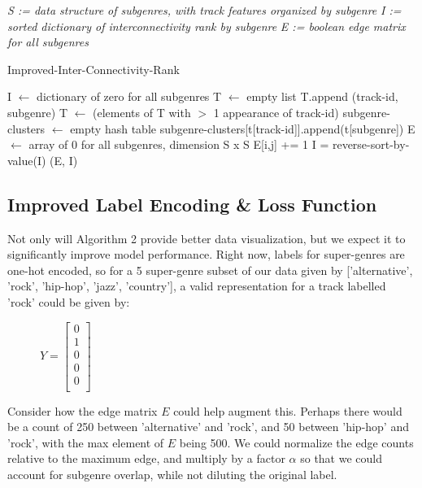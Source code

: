 \documentclass[conference]{IEEEtran}
\begin{document}
\begin{algorithm} 
\textit{S := data structure of subgenres, with track features organized by subgenre}
\newline
\textit{I := sorted dictionary of interconnectivity rank by subgenre}
\newline
\textit{E := boolean edge matrix for all subgenres}
\newline
{}
\newline
\begin{algorithmic}[H]
\caption{Improved-Inter-Connectivity-Rank}
\STATE I $\gets$ dictionary of zero for all subgenres
\STATE T $\gets$ empty list
\STATE T.append (track-id, subgenre) 
\ENDFOR
\ENDFOR
\STATE T $\gets$ (elements of T with $>$ 1 appearance of track-id)
\STATE subgenre-clusters $\gets$ empty hash table
\STATE subgenre-clusters[t[track-id]].append(t[subgenre])
\ENDFOR
\STATE E $\gets$ array of $0$ for all subgenres, dimension S x S
\STATE E[i,j] += 1
\ENDFOR
\ENDFOR
{}
\ENDIF
\ENDFOR
\ENDFOR
\STATE I = reverse-sort-by-value(I)
\RETURN (E, I)
\end{algorithmic}
\end{algorithm}
\raggedbottom
\subsection{Improved Label Encoding \& Loss Function}
Not only will Algorithm 2 provide better data visualization, but we expect it to significantly improve model performance. Right now, labels for super-genres are one-hot encoded, so for a 5 super-genre subset of our data given by ['alternative', 'rock', 'hip-hop', 'jazz', 'country'], a valid representation for a track labelled 'rock' could be given by:

\begin{figure}[ht]
\centering
$Y=
\begin{bmatrix}
0\\
1\\
0\\
0\\
0\\
\end{bmatrix}
$
\end{figure}

Consider how the edge matrix $E$ could help augment this. Perhaps there would be a count of 250 between 'alternative' and 'rock', and 50 between 'hip-hop' and 'rock', with the max element of $E$ being 500. We could normalize the edge counts relative to the maximum edge, and multiply by a factor $\alpha $ so that we could account for subgenre overlap, while not diluting the original label. 
\end{document}
